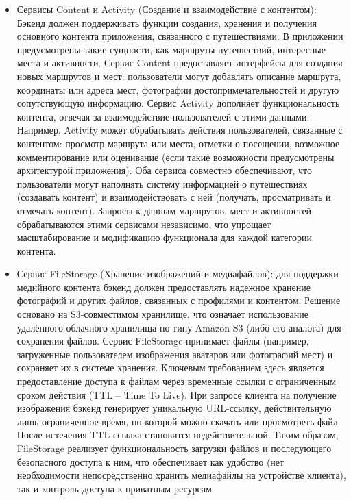 \begin{itemize}
    \item Сервисы Content и Activity (Создание и взаимодействие с контентом): Бэкенд должен поддерживать функции создания, хранения и получения основного контента приложения, связанного с путешествиями. В приложении предусмотрены такие сущности, как маршруты путешествий, интересные места и активности. Сервис Content предоставляет интерфейсы для создания новых маршрутов и мест: пользователи могут добавлять описание маршрута, координаты или адреса мест, фотографии достопримечательностей и другую сопутствующую информацию. Сервис Activity дополняет функциональность контента, отвечая за взаимодействие пользователей с этими данными. Например, Activity может обрабатывать действия пользователей, связанные с контентом: просмотр маршрута или места, отметки о посещении, возможное комментирование или оценивание (если такие возможности предусмотрены архитектурой приложения). Оба сервиса совместно обеспечивают, что пользователи могут наполнять систему информацией о путешествиях (создавать контент) и взаимодействовать с ней (получать, просматривать и отмечать контент). Запросы к данным маршрутов, мест и активностей обрабатываются этими сервисами независимо, что упрощает масштабирование и модификацию функционала для каждой категории контента.
    \item Сервис FileStorage (Хранение изображений и медиафайлов): для поддержки медийного контента бэкенд должен предоставлять надежное хранение фотографий и других файлов, связанных с профилями и контентом. Решение основано на S3-совместимом хранилище, что означает использование удалённого облачного хранилища по типу Amazon S3 (либо его аналога) для сохранения файлов. Сервис FileStorage принимает файлы (например, загруженные пользователем изображения аватаров или фотографий мест) и сохраняет их в системе хранения. Ключевым требованием здесь является предоставление доступа к файлам через временные ссылки с ограниченным сроком действия (TTL – Time To Live). При запросе клиента на получение изображения бэкенд генерирует уникальную URL-ссылку, действительную лишь ограниченное время, по которой можно скачать или просмотреть файл. После истечения TTL ссылка становится недействительной. Таким образом, FileStorage реализует функциональность загрузки файлов и последующего безопасного доступа к ним, что обеспечивает как удобство (нет необходимости непосредственно хранить медиафайлы на устройстве клиента), так и контроль доступа к приватным ресурсам.

\end{itemize}
